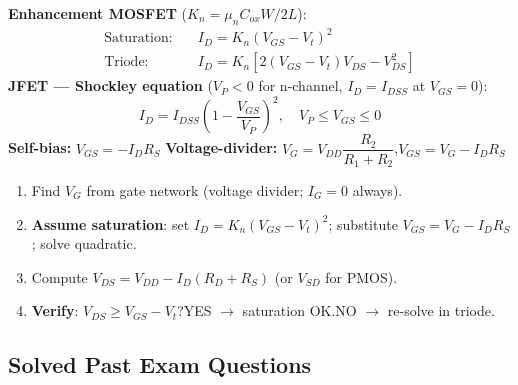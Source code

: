 \documentclass[a4paper, 11pt]{article}
\begin{document}
\begin{tcolorbox}[enhanced, breakable,
  colback=PurpleBG, colframe=Purple, colbacktitle=Purple, coltitle=white,
  fonttitle=\bfseries\sffamily\small, title={\faSquareRootAlt\enspace Key Formulae},
  arc=6pt, boxrule=1.5pt, left=8pt, right=8pt, top=6pt, bottom=6pt]
\textbf{Enhancement MOSFET} ($K_n = \mu_n C_{ox} W/2L$):
\begin{align*}
  \text{Saturation:} &\quad I_D = K_n(V_{GS}-V_t)^2 \\
  \text{Triode:}     &\quad I_D = K_n\!\left[2(V_{GS}-V_t)V_{DS}-V_{DS}^2\right]
\end{align*}
\textbf{JFET --- Shockley equation} ($V_P<0$ for n-channel, $I_D=I_{DSS}$ at $V_{GS}=0$):
\[
  I_D = I_{DSS}\!\left(1-\frac{V_{GS}}{V_P}\right)^{\!2},\quad V_P\leq V_{GS}\leq 0
\]
\textbf{Self-bias:} $V_{GS}=-I_D R_S$ \hspace{2em}
\textbf{Voltage-divider:} $V_G=V_{DD}\dfrac{R_2}{R_1+R_2}$,\quad $V_{GS}=V_G-I_D R_S$
\end{tcolorbox}

\begin{stepsbox}
\begin{enumerate}[noitemsep,topsep=0pt]
  \item Find $V_G$ from gate network (voltage divider; $I_G=0$ always).
  \item \textbf{Assume saturation}: set $I_D=K_n(V_{GS}-V_t)^2$; substitute $V_{GS}=V_G-I_D R_S$; solve quadratic.
  \item Compute $V_{DS}=V_{DD}-I_D(R_D+R_S)$ (or $V_{SD}$ for PMOS).
  \item \textbf{Verify}: $V_{DS}\geq V_{GS}-V_t$?\enspace YES $\to$ saturation OK.\enspace NO $\to$ re-solve in triode.
\end{enumerate}
\end{stepsbox}

\subsection{Solved Past Exam Questions}
\end{document}
